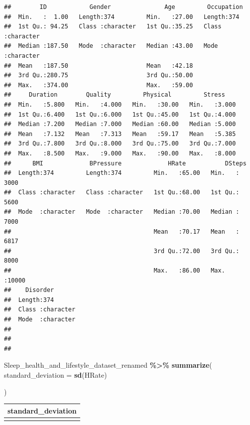 \documentclass[
  11pt,
]{article}
\newenvironment{Shaded}{\begin{snugshade}}{\end{snugshade}}
\newcommand{\AttributeTok}[1]{\textcolor[rgb]{0.13,0.29,0.53}{#1}}
\newcommand{\FunctionTok}[1]{\textcolor[rgb]{0.13,0.29,0.53}{\textbf{#1}}}
\newcommand{\NormalTok}[1]{#1}
\newcommand{\SpecialCharTok}[1]{\textcolor[rgb]{0.81,0.36,0.00}{\textbf{#1}}}
\begin{document}
\begin{verbatim}
##        ID            Gender               Age         Occupation       
##  Min.   :  1.00   Length:374         Min.   :27.00   Length:374        
##  1st Qu.: 94.25   Class :character   1st Qu.:35.25   Class :character  
##  Median :187.50   Mode  :character   Median :43.00   Mode  :character  
##  Mean   :187.50                      Mean   :42.18                     
##  3rd Qu.:280.75                      3rd Qu.:50.00                     
##  Max.   :374.00                      Max.   :59.00                     
##     Duration        Quality         Physical         Stress     
##  Min.   :5.800   Min.   :4.000   Min.   :30.00   Min.   :3.000  
##  1st Qu.:6.400   1st Qu.:6.000   1st Qu.:45.00   1st Qu.:4.000  
##  Median :7.200   Median :7.000   Median :60.00   Median :5.000  
##  Mean   :7.132   Mean   :7.313   Mean   :59.17   Mean   :5.385  
##  3rd Qu.:7.800   3rd Qu.:8.000   3rd Qu.:75.00   3rd Qu.:7.000  
##  Max.   :8.500   Max.   :9.000   Max.   :90.00   Max.   :8.000  
##      BMI             BPressure             HRate           DSteps     
##  Length:374         Length:374         Min.   :65.00   Min.   : 3000  
##  Class :character   Class :character   1st Qu.:68.00   1st Qu.: 5600  
##  Mode  :character   Mode  :character   Median :70.00   Median : 7000  
##                                        Mean   :70.17   Mean   : 6817  
##                                        3rd Qu.:72.00   3rd Qu.: 8000  
##                                        Max.   :86.00   Max.   :10000  
##    Disorder        
##  Length:374        
##  Class :character  
##  Mode  :character  
##                    
##                    
## 
\end{verbatim}

\begin{Shaded}
\begin{Highlighting}[]
\NormalTok{Sleep\_health\_and\_lifestyle\_dataset\_renamed }\SpecialCharTok{\%\textgreater{}\%}
  \FunctionTok{summarize}\NormalTok{(}
    \AttributeTok{standard\_deviation =} \FunctionTok{sd}\NormalTok{(HRate)}
    
\NormalTok{  )}
\end{Highlighting}
\end{Shaded}

\begin{longtable}[]{@{}r@{}}
\toprule\noalign{}
standard\_deviation \\
\midrule\noalign{}
\endhead
\bottomrule\noalign{}
\endlastfoot
4.135675 \\
\end{longtable}
\end{document}
